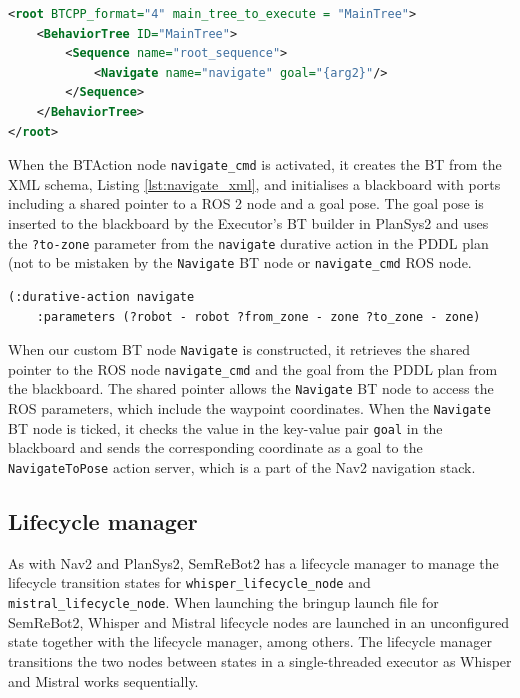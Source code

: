 \begin{lstlisting}[language=XML, caption=The custom BT node Navigate, label=lst:navigate_xml]
<root BTCPP_format="4" main_tree_to_execute = "MainTree">
    <BehaviorTree ID="MainTree">
        <Sequence name="root_sequence">
            <Navigate name="navigate" goal="{arg2}"/>
        </Sequence>
    </BehaviorTree>
</root>
\end{lstlisting}

When the BTAction node \verb|navigate_cmd| is activated, it creates the BT from the XML schema, Listing \ref{lst:navigate_xml}, and initialises a blackboard with ports including a shared pointer to a ROS 2 node and a goal pose. The goal pose is inserted to the blackboard by the Executor's BT builder in PlanSys2 and uses the \verb|?to-zone| parameter from the \verb|navigate| durative action in the PDDL plan (not to be mistaken by the \verb|Navigate| BT node or \verb|navigate_cmd| ROS node.

\begin{lstlisting}[caption={The PDDL action navigate's parameters}, label=lst:navigate_pddl]
(:durative-action navigate
    :parameters (?robot - robot ?from_zone - zone ?to_zone - zone)
\end{lstlisting}

When our custom BT node \verb|Navigate| is constructed, it retrieves the shared pointer to the ROS node \verb|navigate_cmd| and the goal from the PDDL plan from the blackboard. The shared pointer allows the \verb|Navigate| BT node to access the ROS parameters, which include the waypoint coordinates. When the \verb|Navigate| BT node is ticked, it checks the value in the key-value pair \verb|goal| in the blackboard and sends the corresponding coordinate as a goal to the \verb|NavigateToPose| action server, which is a part of the Nav2 navigation stack.

\subsection{Lifecycle manager}
As with Nav2 and PlanSys2, SemReBot2 has a lifecycle manager to manage the lifecycle transition states for \verb|whisper_lifecycle_node| and \verb|mistral_lifecycle_node|. When launching the bringup launch file for SemReBot2, Whisper and Mistral lifecycle nodes are launched in an unconfigured state together with the lifecycle manager, among others. The lifecycle manager transitions the two nodes between states in a single-threaded executor as Whisper and Mistral works sequentially.

